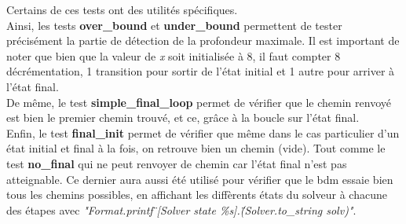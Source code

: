 Certains de ces tests ont des utilités spécifiques.\\
Ainsi, les tests \textbf{over\_bound} et \textbf{under\_bound} permettent de tester précisément la partie de détection de la profondeur maximale. Il est important de noter que bien que la valeur de \textit{x} soit initialisée à 8, il faut compter 8 décrémentation, 1 transition pour sortir de l'état initial et 1 autre pour arriver à l'état final.\\
De même, le test \textbf{simple\_final\_loop} permet de vérifier que le chemin renvoyé est bien le premier chemin trouvé, et ce, grâce à la boucle sur l'état final.\\
Enfin, le test \textbf{final\_init} permet de vérifier que même dans le cas particulier d'un état initial et final à la fois, on retrouve bien un chemin (vide). Tout comme le test \textbf{no\_final} qui ne peut renvoyer de chemin car l'état final n'est pas atteignable. Ce dernier aura aussi été utilisé pour vérifier que le bdm essaie bien tous les chemins possibles, en affichant les diffèrents états du solveur à chacune des étapes avec \textit{"Format.printf \"\@[Solver state \%s\@]\@.\" (Solver.to\_string solv)"}.
